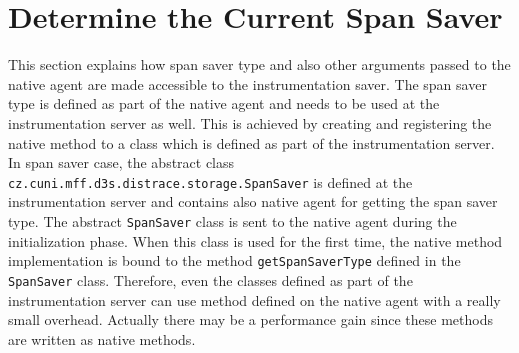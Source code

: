 \section{Determine the Current Span Saver}
This section explains how span saver type and also other arguments passed to the native agent are made accessible to the instrumentation saver. The span saver type is defined as part of the native agent and needs to be used at the instrumentation server as well. This is achieved by creating and registering the native method to a class which is defined as part of the instrumentation server.
In span saver case, the abstract class \texttt{cz.cuni.mff.d3s.distrace.storage.SpanSaver} is defined at the instrumentation server and contains also native agent for getting the span saver type. The abstract \texttt{SpanSaver} class is sent to the native agent during the initialization phase. When this class is used for the first time, the native method implementation is bound to the method \texttt{getSpanSaverType} defined in the \texttt{SpanSaver} class. Therefore, even the classes defined as part of the instrumentation server can use method defined on the native agent with a really small overhead. Actually there may be a performance gain since these methods are written as native methods.



